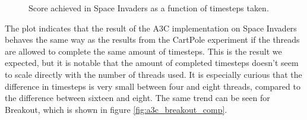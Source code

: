 \documentclass[11pt]{article}
\begin{document}
\begin{figure}[H]
    \caption{Score achieved in Space Invaders as a function of
    timesteps taken.}
    \label{fig:a3c_spaceinvaders_ts}
\end{figure}

The plot indicates that the result of the A3C implementation
on Space Invaders behaves the same way as the results from the CartPole experiment
if the threads are allowed to complete the same amount of timesteps.
This is the result we expected, but it is notable that the amount
of completed timesteps doesn't seem to scale directly with
the number of threads used.
It is especially curious that the difference in timesteps is very small
between four and eight threads, compared to the difference between sixteen and eight.
The same trend can be seen for Breakout, which is shown in figure
\ref{fig:a3c_breakout_comp}.
\end{document}
